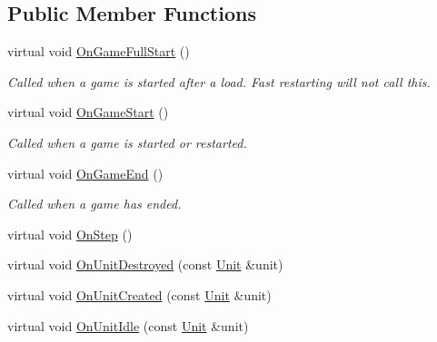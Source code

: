 \subsection*{Public Member Functions}
\begin{DoxyCompactItemize}
\item 
\mbox{\label{classsc2_1_1_client_events_ab980f6942030d3a0cd42e00782742237}} 
virtual void \hyperlink{classsc2_1_1_client_events_ab980f6942030d3a0cd42e00782742237}{On\+Game\+Full\+Start} ()
\begin{DoxyCompactList}\small\item\em Called when a game is started after a load. Fast restarting will not call this. \end{DoxyCompactList}\item 
\mbox{\label{classsc2_1_1_client_events_a6e2542b183f6ac980440cc93476163a3}} 
virtual void \hyperlink{classsc2_1_1_client_events_a6e2542b183f6ac980440cc93476163a3}{On\+Game\+Start} ()
\begin{DoxyCompactList}\small\item\em Called when a game is started or restarted. \end{DoxyCompactList}\item 
\mbox{\label{classsc2_1_1_client_events_a2c5023d18ffc88bed76c844e643ef60d}} 
virtual void \hyperlink{classsc2_1_1_client_events_a2c5023d18ffc88bed76c844e643ef60d}{On\+Game\+End} ()
\begin{DoxyCompactList}\small\item\em Called when a game has ended. \end{DoxyCompactList}\item 
virtual void \hyperlink{classsc2_1_1_client_events_a6f5839e220d2a5a19b30065e0b8290c4}{On\+Step} ()
\item 
virtual void \hyperlink{classsc2_1_1_client_events_ae80cd238b975c76b5db062939949b598}{On\+Unit\+Destroyed} (const \hyperlink{classsc2_1_1_unit}{Unit} \&unit)
\item 
virtual void \hyperlink{classsc2_1_1_client_events_a2619e1734feeccd4f8412fd7447fe230}{On\+Unit\+Created} (const \hyperlink{classsc2_1_1_unit}{Unit} \&unit)
\item 
virtual void \hyperlink{classsc2_1_1_client_events_a5d57eb9cdfa579a7c50442305dbf8635}{On\+Unit\+Idle} (const \hyperlink{classsc2_1_1_unit}{Unit} \&unit)

\end{DoxyCompactItemize}
